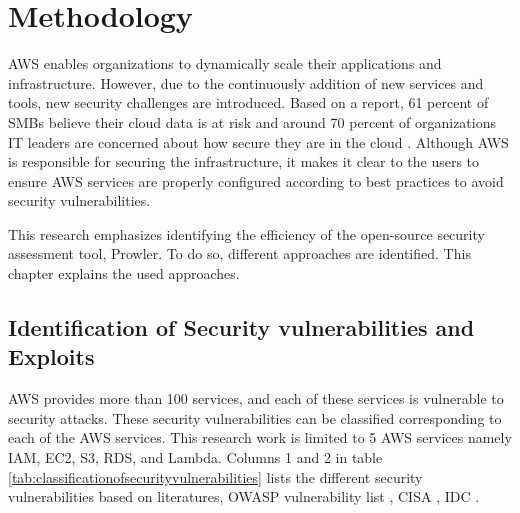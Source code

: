 
\chapter{Methodology}

\par AWS enables organizations to dynamically scale their applications and infrastructure.
However, due to the continuously addition of new services
and tools, new security challenges are
introduced.
Based on a report, 61 percent of SMBs believe their cloud data is at risk and around 70 percent of organizations IT leaders are concerned about how secure they are in the cloud \cite{65}.
Although AWS is responsible for securing the infrastructure, it makes it clear to the users to ensure AWS services are properly configured according to best practices to avoid security vulnerabilities.

\par This research emphasizes identifying the efficiency of the open-source security assessment tool, Prowler.
To do so, different approaches are identified. This chapter explains the used approaches.


\section{Identification of Security vulnerabilities and Exploits}

\par AWS provides more than 100 services, and each of these services is vulnerable to security attacks.
These security vulnerabilities can be classified corresponding to each of the AWS services.
This research work is limited to 5 AWS services namely IAM, EC2, S3, RDS, and Lambda.
Columns 1 and 2 in table \ref{tab:classificationofsecurityvulnerabilities} lists the different security
vulnerabilities based on literatures, OWASP vulnerability list \cite{43}, CISA \cite{42}, IDC \cite{41}.

